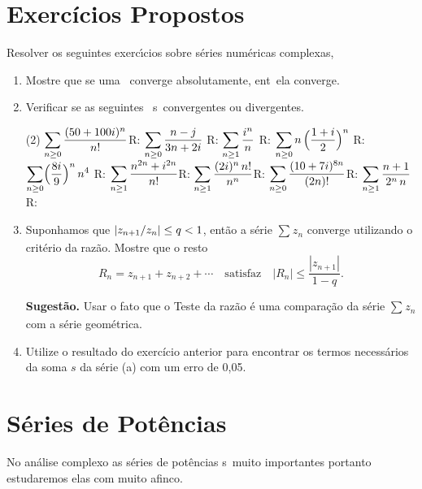 \section*{Exercícios Propostos} 
Resolver os seguintes exerc\'{\i}cios sobre s\'{e}ries num\'{e}ricas complexas,
\begin{enumerate}[label=\rm{(\arabic*)}]
  \item Mostre que se uma \ser\ converge absolutamente, ent\ao\
  ela converge.
  \item Verificar se as seguintes \sers\ s\ao\ convergentes ou
  divergentes.
\begin{tasks}[label=(\alph*),item-indent=3em,label-width=4ex,ref=(\alph*)](2)
\task  \(\displaystyle \sum_{n\geq 0}\dfrac{(50+100i)^n}{n!}\)\quad   R: 
\task  \(\displaystyle \sum_{n\geq 0}\dfrac{n-j}{3n+2i}\) \quad   R:
\task  \(\displaystyle \sum_{n\geq 1}\dfrac{i^n}{n}\)   \quad R:
\task  \(\displaystyle \sum_{n\geq 0}n\,\Bigl(\dfrac{1+i}{2}\Bigr)^{n}\) \quad  R:
\task  \(\displaystyle \sum_{n\geq 0}\Bigl(\dfrac{8i}{9}\Bigr)^n\,n^{4}\)  \quad R: 
\task  \(\displaystyle \sum_{n\geq 1}\dfrac{n^{2n}+i^{2n}}{n!}\)\quad  R:
\task  \(\displaystyle \sum_{n\geq 1}\dfrac{(2i)^n\,n!}{n^n}\)\quad   R:
\task  \(\displaystyle \sum_{n\geq 0}\dfrac{(10+7i)^{8n}}{(2n)!}\)\quad   R:
\task  \(\displaystyle \sum_{n\geq 1}\dfrac{n+1}{2^n\,n}\) \quad   R: 
\end{tasks}

\item Suponhamos que $\displaystyle{|z_{n+1}/z_{n}|\leq q<1}$, então a
série $\sum_{}z_{n}$ converge utilizando o critério da razão. Mostre que o resto 
\begin{equation*}
R_{n}=z_{n+1}+z_{n+2}+\cdots \quad  \text{satisfaz} \quad |R_{n}|\leq \dfrac{|z_{n+1}|}{1-q}.
\end{equation*}

\textbf{Sugestão.} Usar o fato que o
Teste da razão é uma comparação da série $\sum_{}z_{n}$ com a série geométrica.

\item Utilize o resultado do exercício anterior para encontrar
os termos necessários da soma $s$ da série (a) com um erro  de 0,05.
\end{enumerate}

\section{S\'{e}ries de Pot\^{e}ncias }
No an\'alise complexo as s\'{e}ries de pot\^{e}ncias s\ao\ muito
importantes portanto estudaremos elas com muito afinco.

